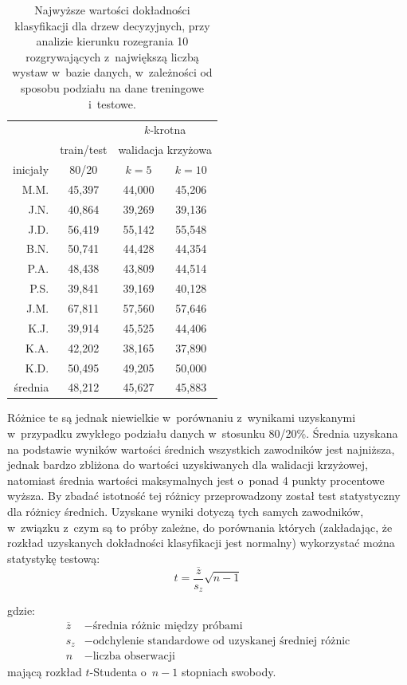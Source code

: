 \documentclass[a4paper,twoside,12pt]{book}
\begin{document}
\begin{table}
\centering
\caption{Najwyższe wartości dokładności klasyfikacji dla drzew decyzyjnych, przy analizie kierunku rozegrania 10 rozgrywających z~największą liczbą wystaw w~bazie danych, w~zależności od sposobu podziału na dane treningowe i~testowe.}
\label{tab:drzewaKierunekMaxFolds}
\begin{tabular}{rccc}
\toprule
 &            & \multicolumn{2}{c}{$k$-krotna}\\
 & train/test & \multicolumn{2}{c}{walidacja krzyżowa}\\
 \cmidrule{3-4}
inicjały & 80/20 & $k=5$ & $k=10$ \\
\midrule
M.M. & 45,397 & 44,000 & 45,206 \\ 
J.N. & 40,864 & 39,269 & 39,136 \\
J.D. & 56,419 & 55,142 & 55,548 \\
B.N. & 50,741 & 44,428 & 44,354 \\
P.A. & 48,438 & 43,809 & 44,514 \\
P.S. & 39,841 & 39,169 & 40,128 \\
J.M. & 67,811 & 57,560 & 57,646 \\
K.J. & 39,914 & 45,525 & 44,406 \\
K.A. & 42,202 & 38,165 & 37,890 \\
K.D. & 50,495 & 49,205 & 50,000 \\
\midrule 
{średnia} & {48,212} & {45,627} & {45,883} \\
\bottomrule
\end{tabular}
\end{table}

Różnice te są jednak niewielkie w~porównaniu z~wynikami uzyskanymi w~przypadku zwykłego podziału danych w~stosunku 80/20\%. Średnia uzyskana na podstawie wyników wartości średnich wszystkich zawodników jest najniższa, jednak bardzo zbliżona do wartości uzyskiwanych dla walidacji krzyżowej, natomiast średnia wartości maksymalnych jest o~ponad 4 punkty procentowe wyższa. By zbadać istotność tej różnicy przeprowadzony został test statystyczny dla różnicy średnich. Uzyskane wyniki dotyczą tych samych zawodników, w~związku z~czym są to próby zależne, do porównania których (zakładając, że rozkład uzyskanych dokładności klasyfikacji jest normalny) wykorzystać można statystykę testową:
\[t=\frac{\overline{z}}{s_z}\sqrt{n-1}\]

gdzie:
\begin{align*}
	\overline{z} &- \text{średnia różnic między próbami}\\
    s_z &- \text{odchylenie standardowe od uzyskanej średniej różnic}\\
    n &- \text{liczba obserwacji}
\end{align*}
mającą rozkład $t$-Studenta o~$n-1$ stopniach swobody.
\end{document}
